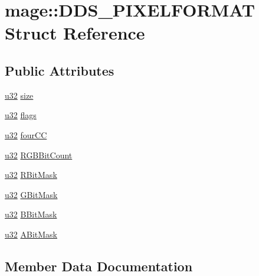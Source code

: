 \hypertarget{structmage_1_1_d_d_s___p_i_x_e_l_f_o_r_m_a_t}{}\section{mage\+:\+:D\+D\+S\+\_\+\+P\+I\+X\+E\+L\+F\+O\+R\+M\+AT Struct Reference}
\label{structmage_1_1_d_d_s___p_i_x_e_l_f_o_r_m_a_t}
\subsection*{Public Attributes}
\begin{DoxyCompactItemize}
\item 
\hyperlink{namespacemage_af2b398bf98eb10351f49cad73fe2cc73}{u32} \hyperlink{structmage_1_1_d_d_s___p_i_x_e_l_f_o_r_m_a_t_aa990284649b37b8eb6c7f927ee188ec6}{size}
\item 
\hyperlink{namespacemage_af2b398bf98eb10351f49cad73fe2cc73}{u32} \hyperlink{structmage_1_1_d_d_s___p_i_x_e_l_f_o_r_m_a_t_a89ae5ca82d899290e9ba460e789cecaf}{flags}
\item 
\hyperlink{namespacemage_af2b398bf98eb10351f49cad73fe2cc73}{u32} \hyperlink{structmage_1_1_d_d_s___p_i_x_e_l_f_o_r_m_a_t_a4398fd65fc4b50a8dc489619176350d9}{four\+CC}
\item 
\hyperlink{namespacemage_af2b398bf98eb10351f49cad73fe2cc73}{u32} \hyperlink{structmage_1_1_d_d_s___p_i_x_e_l_f_o_r_m_a_t_ab942e3107de264a87cfd5bbacc8bfd3b}{R\+G\+B\+Bit\+Count}
\item 
\hyperlink{namespacemage_af2b398bf98eb10351f49cad73fe2cc73}{u32} \hyperlink{structmage_1_1_d_d_s___p_i_x_e_l_f_o_r_m_a_t_aadf44e48cdc8a3d2355528621669260b}{R\+Bit\+Mask}
\item 
\hyperlink{namespacemage_af2b398bf98eb10351f49cad73fe2cc73}{u32} \hyperlink{structmage_1_1_d_d_s___p_i_x_e_l_f_o_r_m_a_t_a3129b9f6689f7ca1af793caa206a6355}{G\+Bit\+Mask}
\item 
\hyperlink{namespacemage_af2b398bf98eb10351f49cad73fe2cc73}{u32} \hyperlink{structmage_1_1_d_d_s___p_i_x_e_l_f_o_r_m_a_t_afcb687d25fe439c50f5a14c47c749f8c}{B\+Bit\+Mask}
\item 
\hyperlink{namespacemage_af2b398bf98eb10351f49cad73fe2cc73}{u32} \hyperlink{structmage_1_1_d_d_s___p_i_x_e_l_f_o_r_m_a_t_a668e4c4c06ad44ac4410f3fceb8d1bdc}{A\+Bit\+Mask}
\end{DoxyCompactItemize}


\subsection{Member Data Documentation}
\hypertarget{structmage_1_1_d_d_s___p_i_x_e_l_f_o_r_m_a_t_a668e4c4c06ad44ac4410f3fceb8d1bdc}{}\label{structmage_1_1_d_d_s___p_i_x_e_l_f_o_r_m_a_t_a668e4c4c06ad44ac4410f3fceb8d1bdc} 
